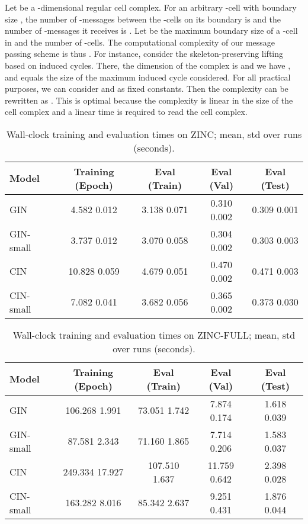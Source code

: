 \documentclass{article}
\begin{document}
Let  be a -dimensional regular cell complex. For an arbitrary -cell  with boundary size , the  number of -messages between the -cells on its boundary is  and the number of -messages it receives is . Let  be the maximum boundary size of a -cell in  and  the number of -cells. The computational complexity of our message passing scheme is thus . For instance, consider the skeleton-preserving lifting based on induced cycles. There, the dimension of the complex is  and we have , and  equals the size of the maximum induced cycle considered. For all practical purposes, we can consider  and  as fixed constants. Then the complexity can be rewritten as . This is optimal because the complexity is linear in the size of the cell complex and a linear time is required to read the cell complex. 


\begin{table}[h!]
    \centering
    \caption{Wall-clock training and evaluation times on ZINC; mean, std over  runs (seconds).}
    \label{tab:zinc_training_time}
    \vspace{1mm}
\begin{tabular}{l|cccc}
    \toprule
    Model & 
        Training (Epoch) & 
        Eval (Train) &
        Eval (Val) &
        Eval (Test) \\
    \midrule
    GIN &
        4.582  0.012 &
        3.138  0.071 & 
        0.310  0.002 &
        0.309  0.001 \\
    GIN-small &
        3.737  0.012 &
        3.070  0.058 &
        0.304  0.002 &
        0.303  0.003 \\
    \midrule
    CIN &
        10.828  0.059 &
        4.679  0.051 &
        0.470  0.002 &
        0.471  0.003 \\
    CIN-small &
        7.082  0.041 &
        3.682  0.056 &
        0.365  0.002 &
        0.373  0.030 \\
    \bottomrule
    \end{tabular}
\end{table}

\begin{table}[h!]
    \centering
    \caption{Wall-clock training and evaluation times on ZINC-FULL; mean, std over  runs (seconds).}
    \label{tab:zincfull_training_time}
    \vspace{1mm}
\begin{tabular}{l|cccc}
    \toprule
    Model & 
        Training (Epoch) & 
        Eval (Train) &
        Eval (Val) &
        Eval (Test) \\
    \midrule
    GIN &
        106.268  1.991 &
        73.051   1.742 &
        7.874   0.174 &
        1.618  0.039 \\
    GIN-small &
        87.581  2.343 &
        71.160  1.865 &
        7.714  0.206 &
        1.583  0.037 \\
    \midrule
    CIN &
        249.334  17.927 &
        107.510  1.637 &
        11.759  0.642 &
        2.398  0.028 \\
    CIN-small &
        163.282  8.016 &
        85.342  2.637 &
        9.251  0.431 &
        1.876  0.044 \\
    \bottomrule
    \end{tabular}
\end{table}
\end{document}
